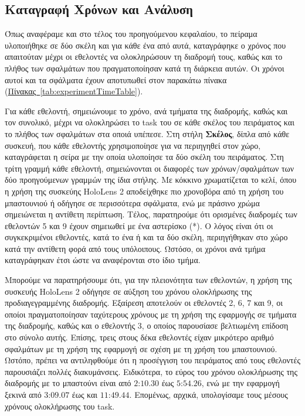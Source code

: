 \subsection{Καταγραφή Χρόνων και Ανάλυση}

Όπως αναφέραμε και στο τέλος του προηγούμενου κεφαλαίου, το πείραμα υλοποιήθηκε σε δύο σκέλη και για κάθε ένα από αυτά, καταγράφηκε ο χρόνος που απαιτούταν μέχρι οι εθελοντές να ολοκληρώσουν τη διαδρομή τους, καθώς και το πλήθος των σφαλμάτων που πραγματοποίησαν κατά τη διάρκεια αυτών. Οι χρόνοι αυτοί και τα σφάλματα έχουν αποτυπωθεί στον παρακάτω πίνακα (\hyperref[tab:experimentTimeTable]{Πίνακας~\ref*{tab:experimentTimeTable}}).



Για κάθε εθελοντή, σημειώνουμε το χρόνο, ανά τμήματα της διαδρομής, καθώς και τον συνολικό, μέχρι να ολοκληρώσει το task του σε κάθε σκέλος του πειράματος και το πλήθος των σφαλμάτων στα οποιά υπέπεσε. Στη στήλη \textbf{Σκέλος}, δίπλα από κάθε συσκευή, που κάθε εθελοντής χρησιμοποίησε για να περιηγηθεί στον χώρο, καταγράφεται η σείρα με την οποία υλοποίησε τα δύο σκέλη του πειράματος. Στη τρίτη γραμμή κάθε εθελοντή, σημειώνονται οι διαφορές των χρόνων/σφαλμάτων των δύο προηγούμενων γραμμών της ίδια στήλης. Με κόκκινο χρωματίζεται το κελί, όπου η χρήση της συσκεύης HoloLens 2 αποδείχθηκε πιο χρονοβόρα από τη χρήση του μπαστουνιού ή οδήγησε σε περισσότερα σφάλματα, ενώ με πράσινο χρώμα σημειώνεται η αντίθετη περίπτωση. Τέλος, παρατηρούμε ότι ορισμένες διαδρομές των εθελοντών 5 και 9 έχουν σημειωθεί με ένα αστερίσκο (*). Ο λόγος είναι ότι οι συγκεκριμένοι εθελοντές, κατά το ένα ή και τα δύο σκέλη, περιηγήθηκαν στο χώρο κατά την αντίθετη φορά από τους υπόλοιπους. Ωστόσο, οι χρόνοι ανά τμήμα καταγράφηκαν έτσι ώστε να αναφέρονται στο ίδιο τμήμα.

Μπορούμε να παρατηρήσουμε ότι, για την πλειονότητα των εθελοντών, η χρήση της συσκευής HoloLens 2 οδήγησε σε αύξηση του χρόνου ολοκλήρωσης της προδιαγεγραμμένης διαδρομής. Εξαίρεση αποτελούν οι εθελοντές 2, 6, 7 και 9, οι οποίοι πραγματοποίησαν ταχύτερους χρόνους με τη χρήση της εφαρμογής σε τμήματα της διαδρομής, καθώς και ο εθελοντής 3, ο οποίος παρουσίασε βελτιωμένη επίδοση στο σύνολο αυτής. Επίσης, τρεις στους δέκα εθελοντές είχαν μικρότερο αριθμό σφαλμάτων με τη χρήση της εφαρμογή σε σχέση με τη χρήση του μπαστουνιού. Ωστόπο, πρέπει να αντιληφθούμε ότι η προσέγγιση του πειράματος από τους εθελοντές παρουσιάζει πολλές διακυμάνσεις. Ειδικότερα, το εύρος του χρόνου ολοκλήρωσης της διαδρομής με το μπαστούνι είναι από $\text{2:10.30}$ έως $\text{5:54.26}$, ενώ με την εφαρμογή ξεκινά από $\text{3:09.07}$ έως και $\text{11:49.44}$. Επομένως, αρχικά, υπολογίσαμε τους μέσους χρόνους ολοκλήρωσης του task.

